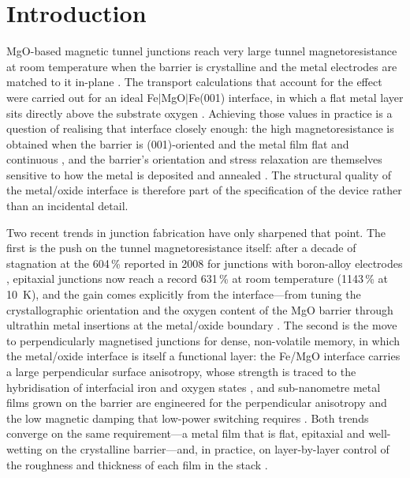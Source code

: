 \section{Introduction}
\label{sec:intro}

MgO-based magnetic tunnel junctions reach very large tunnel magnetoresistance at room temperature
when the barrier is crystalline and the metal electrodes are matched to it in-plane
\cite{yuasa2004,parkin2004}. The transport calculations that account for the effect were carried out
for an ideal Fe$|$MgO$|$Fe(001) interface, in which a flat metal layer sits directly above the
substrate oxygen \cite{butler2001}. Achieving those values in practice is a question of realising
that interface closely enough: the high magnetoresistance is obtained when the barrier is
(001)-oriented and the metal film flat and continuous \cite{yuasa2004}, and the barrier's
orientation and stress relaxation are themselves sensitive to how the metal is deposited and
annealed \cite{djayaprawira2005,ikeda2008}. The structural quality of the metal/oxide interface is
therefore part of the specification of the device rather than an incidental detail.

Two recent trends in junction fabrication have only sharpened that point. The first is the push on
the tunnel magnetoresistance itself: after a decade of stagnation at the 604\,\% reported in 2008
for junctions with boron-alloy electrodes \cite{ikeda2008}, epitaxial junctions now reach a record
631\,\% at room temperature (1143\,\% at 10~K), and the gain comes explicitly from the
interface---from tuning the crystallographic orientation and the oxygen content of the MgO barrier
through ultrathin metal insertions at the metal/oxide boundary \cite{scheike2023}. The second is the
move to perpendicularly magnetised junctions for dense, non-volatile memory, in which the
metal/oxide interface is itself a functional layer: the Fe/MgO interface carries a large
perpendicular surface anisotropy, whose strength is traced to the hybridisation of interfacial iron
and oxygen states \cite{solano2022}, and sub-nanometre metal films grown on the barrier are
engineered for the perpendicular anisotropy and the low magnetic damping that low-power switching
requires \cite{ichinose2025}. Both trends converge on the same requirement---a metal film that is
flat, epitaxial and well-wetting on the crystalline barrier---and, in practice, on layer-by-layer
control of the roughness and thickness of each film in the stack \cite{ghemes2024}.

